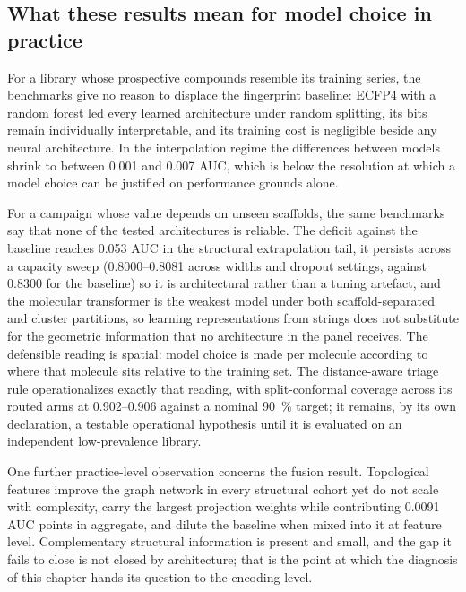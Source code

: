 \subsection{What these results mean for model choice in practice}\label{sec:res_model_choice}

For a library whose prospective compounds resemble its training series, the benchmarks give no reason to displace the fingerprint baseline: ECFP4 with a random forest led every learned architecture under random splitting, its bits remain individually interpretable, and its training cost is negligible beside any neural architecture. In the interpolation regime the differences between models shrink to between \num{0.001} and \num{0.007} AUC, which is below the resolution at which a model choice can be justified on performance grounds alone.

For a campaign whose value depends on unseen scaffolds, the same benchmarks say that none of the tested architectures is reliable. The deficit against the baseline reaches \num{0.053} AUC in the structural extrapolation tail, it persists across a capacity sweep (\numrange{0.8000}{0.8081} across widths and dropout settings, against \num{0.8300} for the baseline) so it is architectural rather than a tuning artefact, and the molecular transformer is the weakest model under both scaffold-separated and cluster partitions, so learning representations from strings does not substitute for the geometric information that no architecture in the panel receives. The defensible reading is spatial: model choice is made per molecule according to where that molecule sits relative to the training set. The distance-aware triage rule operationalizes exactly that reading, with split-conformal coverage across its routed arms at \numrange{0.902}{0.906} against a nominal \qty{90}{\percent} target; it remains, by its own declaration, a testable operational hypothesis until it is evaluated on an independent low-prevalence library.

One further practice-level observation concerns the fusion result. Topological features improve the graph network in every structural cohort yet do not scale with complexity, carry the largest projection weights while contributing \num{0.0091} AUC points in aggregate, and dilute the baseline when mixed into it at feature level. Complementary structural information is present and small, and the gap it fails to close is not closed by architecture; that is the point at which the diagnosis of this chapter hands its question to the encoding level.

